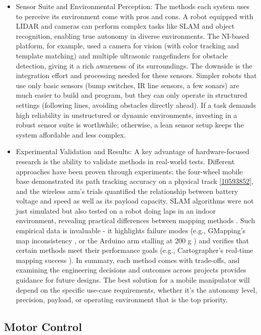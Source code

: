 \documentclass{article}
\begin{document}
\begin{itemize}
  \item Sensor Suite and Environmental Perception: The methods each system uses to perceive its environment come with pros and cons. A robot equipped with LIDAR and cameras can perform complex tasks like SLAM and object recognition, enabling true autonomy in diverse environments. The NI-based platform, for example, used a camera for vision (with color tracking and template matching) and multiple ultrasonic rangefinders for obstacle detection, giving it a rich awareness of its surroundings. The downside is the integration effort and processing needed for these sensors. Simpler robots that use only basic sensors (bump switches, IR line sensors, a few sonars) are much easier to build and program, but they can only operate in structured settings (following lines, avoiding obstacles directly ahead). If a task demands high reliability in unstructured or dynamic environments, investing in a robust sensor suite is worthwhile; otherwise, a lean sensor setup keeps the system affordable and less complex.
  
  \item Experimental Validation and Results: A key advantage of hardware-focused research is the ability to validate methods in real-world tests. Different approaches have been proven through experiments: the four-wheel mobile base demonstrated its path tracking accuracy on a physical track \ref{10593852}, and the wireless arm's trials quantified the relationship between battery voltage and speed \cite{YUSOFF20121072} as well as its payload capacity. SLAM algorithms were not just simulated but also tested on a robot doing laps in an indoor environment, revealing practical differences between mapping methods \cite{8710464}. Such empirical data is invaluable - it highlights failure modes (e.g., GMapping's map inconsistency \cite{8710464}, or the Arduino arm stalling at 200 g \cite{YUSOFF20121072}) and verifies that certain methods meet their performance goals (e.g., Cartographer's real-time mapping success \cite{7487258}). In summary, each method comes with trade-offs, and examining the engineering decisions and outcomes across projects provides guidance for future designs. The best solution for a mobile manipulator will depend on the specific use-case requirements, whether it's the autonomy level, precision, payload, or operating environment that is the top priority.

\end{itemize}

\subsection{Motor Control}
\end{document}
